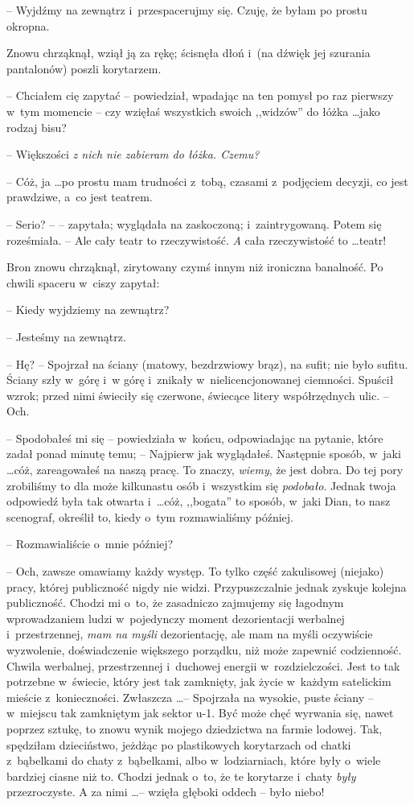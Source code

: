 \documentclass[oneside,polish,11pt,rmheadings]{mwbk}
\begin{document}
-- Wyjdźmy na zewnątrz i~przespacerujmy się. Czuję, że byłam po prostu okropna. 

Znowu chrząknął, wziął ją za rękę; ścisnęła dłoń i~(na dźwięk jej szurania pantalonów) poszli korytarzem.  

-- Chciałem cię zapytać -- powiedział, wpadając na ten pomysł po raz pierwszy w~tym momencie -- czy wzięłaś wszystkich swoich ,,widzów'' do łóżka \ldots  jako rodzaj bisu? 

-- Większości \textit{z nich nie zabieram do łóżka. Czemu?} 

-- Cóż, ja \ldots  po prostu mam trudności z~tobą, czasami z~podjęciem decyzji, co jest prawdziwe, a~co jest teatrem.  

-- Serio? -- -- zapytała; wyglądała na zaskoczoną; i~zaintrygowaną. Potem się roześmiała. -- Ale cały teatr to rzeczywistość. \textit{A }cała rzeczywistość to \ldots  teatr! 

Bron znowu chrząknął, zirytowany czymś innym niż ironiczna banalność. Po chwili spaceru w~ciszy zapytał:

-- Kiedy wyjdziemy na zewnątrz? 

-- Jesteśmy na zewnątrz. 

-- Hę? -- Spojrzał na ściany (matowy, bezdrzwiowy brąz), na sufit; nie było sufitu. Ściany szły w~górę i~w górę i~znikały w~nielicencjonowanej ciemności. Spuścił wzrok; przed nimi świeciły się czerwone, świecące litery współrzędnych ulic. -- Och. 

-- Spodobałeś mi się -- powiedziała w~końcu, odpowiadając na pytanie, które zadał ponad minutę temu; -- Najpierw jak wyglądałeś. Następnie sposób, w~jaki \ldots  cóż, zareagowałeś na naszą pracę. To znaczy, \textit{wiemy}, że jest dobra. Do tej pory zrobiliśmy to dla może kilkunastu osób i~wszystkim się \textit{podobało}. Jednak twoja odpowiedź była tak otwarta i~\ldots  cóż, ,,bogata'' to sposób, w~jaki Dian, to nasz scenograf, określił to, kiedy o~tym rozmawialiśmy później. 

-- Rozmawialiście o~mnie później? 

-- Och, zawsze omawiamy każdy występ. To tylko część zakulisowej (niejako) pracy, której publiczność nigdy nie widzi. Przypuszczalnie jednak zyskuje kolejna publiczność. Chodzi mi o~to, że zasadniczo zajmujemy się łagodnym wprowadzaniem ludzi w~pojedynczy moment dezorientacji werbalnej i~przestrzennej, \textit{mam na myśli} dezorientację, ale mam na myśli oczywiście wyzwolenie, doświadczenie większego porządku, niż może zapewnić codzienność. Chwila werbalnej, przestrzennej i~duchowej energii w~rozdzielczości. Jest to tak potrzebne w~świecie, który jest tak zamknięty, jak życie w~każdym satelickim mieście z~konieczności. Zwłaszcza \ldots  -- Spojrzała na wysokie, puste ściany -- w~miejscu tak zamkniętym jak sektor u-1.  Być może chęć wyrwania się, nawet poprzez sztukę, to znowu wynik mojego dziedzictwa na farmie lodowej. Tak, spędziłam dzieciństwo, jeżdżąc po plastikowych korytarzach od chatki z~bąbelkami do chaty z~bąbelkami, albo w~lodziarniach, które były o~wiele bardziej ciasne niż to. Chodzi jednak o~to, że te korytarze i~chaty \textit{były }przezroczyste. A za nimi \ldots  -- wzięła głęboki oddech -- było niebo! 
\end{document}
